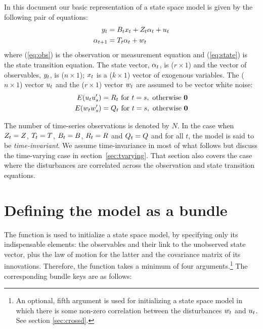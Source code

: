 In this document our basic representation of a state space model is
given by the following pair of equations:
%
\begin{align}
  \label{eq:obs}
  y_t &= B_tx_t + Z_t \alpha_t +
  u_t \\
  \label{eq:state}
  \alpha_{t+1} &= T_t \alpha_t + w_t
\end{align}
%
where (\ref{eq:obs}) is the observation or measurement equation and
(\ref{eq:state}) is the state transition equation.  The state
vector, $\alpha_{t}$, is ($r \times 1$) and the vector of
observables, $y_t$, is ($n \times 1$); $x_t$ is a ($k
\times 1$) vector of exogenous variables.  The ($n \times 1$) vector
$u_t$ and the ($r \times 1$) vector $w_t$ are assumed to
be vector white noise:
%
\begin{align*}
E(u_t u_s') &= R_t \mbox{ for } t = s,
    \mbox{ otherwise } \mathbf{0} \\
E(w_t w_s') &= Q_t \mbox{ for } t = s,
    \mbox{ otherwise } \mathbf{0}
\end{align*}

The number of time-series observations is denoted by $N$.  In the case
when $Z_t = Z$, $T_t = T$,
$B_t = B$, $R_t = R$ and
$Q_t = Q$ and for all $t$, the model is said to be
\emph{time-invariant}. We assume time-invariance in most of what
follows but discuss the time-varying case in
section~\ref{sec:tvarying}. That section also covers the case where
the disturbances are correlated across the observation and state
transition equations.

\section{Defining the model as a bundle}
\label{sec:setup}

The  function is used to initialize a state space model,
by specifying only its indispensable elements: the observables and
their link to the unobserved state vector, plus the law of motion for
the latter and the covariance matrix of its innovations. Therefore,
the function takes a minimum of four arguments.\footnote{An optional,
  fifth argument is used for initializing a state space model in which
  there is some non-zero correlation between the disturbances
  $w_t$ and $u_t$. See section \ref{sec:crossd}.} The
corresponding bundle keys are as follows:

